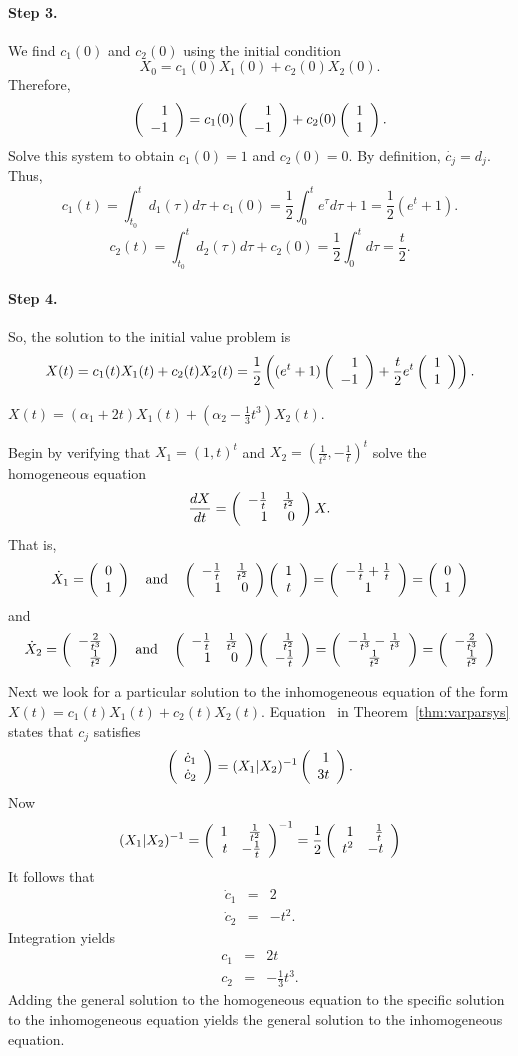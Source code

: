 \paragraph{Step 3.} We find $c_1(0)$ and $c_2(0)$ using the initial
condition
\[
X_0 = c_1(0)X_1(0) + c_2(0)X_2(0).
\]
Therefore,
\[
\left(\begin{array}{r} 1 \\ -1\end{array}\right) = c_1(0)\left(\begin{array}{r} 1 \\ -1\end{array}\right) + c_2(0)\left(\begin{array}{r} 1 \\ 1\end{array}\right).
\]
Solve this system to obtain $c_1(0) = 1$ and $c_2(0) = 0$.  By definition,
$\dot{c_j} = d_j$.  Thus,
\[
c_1(t) = \int_{t_0}^td_1(\tau)d\tau + c_1(0)
= \frac{1}{2}\int_0^te^\tau d\tau + 1 = \frac{1}{2}(e^t + 1).
\]
\[
c_2(t) = \int_{t_0}^td_2(\tau)d\tau + c_2(0)
= \frac{1}{2}\int_0^td\tau = \frac{t}{2}.
\]
\paragraph{Step 4.} So, the solution to the initial value problem is
\[
X(t) = c_1(t)X_1(t) + c_2(t)X_2(t)
= \frac{1}{2}\left((e^t + 1)\left(\begin{array}{r} 1 \\ -1\end{array}\right) + \frac{t}{2}e^t\left(\begin{array}{r} 1 \\ 1\end{array}\right)
\right).
\]

 \ans $X(t) = (\alpha_1+2t)X_1(t) + 
\left(\alpha_2-\frac{1}{3}t^3 \right)X_2(t)$.

\soln  Begin by verifying that $X_1=(1,t)^t$ and 
$X_2=(\frac{1}{t^2},-\frac{1}{t})^t$ solve the homogeneous
equation
\[
\frac{dX}{dt}= \left(\begin{array}{rr} -\frac{1}{t} & \frac{1}{t^2}\\ 1 &0\end{array}\right)X.
\]
That is,
\[
\dot{X}_1 = \left(\begin{array}{c} 0 \\ 1\end{array}\right) \quad\mbox{and}\quad 
\left(\begin{array}{rr} -\frac{1}{t} & \frac{1}{t^2}\\ 1 &0\end{array}\right)\left(\begin{array}{c} 1 \\ t\end{array}\right) = 
\left(\begin{array}{c} -\frac{1}{t}+\frac{1}{t} \\ 1\end{array}\right) = \left(\begin{array}{c} 0 \\ 1\end{array}\right)
\]
and 
\[
\dot{X}_2 = \left(\begin{array}{r} -\frac{2}{t^3} \\ \frac{1}{t^2}\end{array}\right) \quad\mbox{and}\quad 
\left(\begin{array}{rr} -\frac{1}{t} & \frac{1}{t^2}\\ 1 &0\end{array}\right)
\left(\begin{array}{r} \frac{1}{t^2} \\ -\frac{1}{t}\end{array}\right) = 
\left(\begin{array}{c} -\frac{1}{t^3}-\frac{1}{t^3} \\ \frac{1}{t^2}\end{array}\right) 
= \left(\begin{array}{r} -\frac{2}{t^3} \\ \frac{1}{t^2}\end{array}\right)
\]

Next we look for a particular solution to the inhomogeneous equation of 
the form $X(t)=c_1(t)X_1(t)+c_2(t)X_2(t)$.  Equation~ in
Theorem~\ref{thm:varparsys} states that $c_j$ satisfies
\[
\left(\begin{array}{r} \dot{c}_1 \\ \dot{c}_2\end{array}\right) = (X_1|X_2)^{-1} \left(\begin{array}{r} 1 \\ 3t\end{array}\right).
\]
Now 
\[
(X_1|X_2)^{-1} = \left(\begin{array}{rr} 1 & \frac{1}{t^2}\\ t &-\frac{1}{t}\end{array}\right)^{-1} = 
\frac{1}{2}\left(\begin{array}{rr} 1 & \frac{1}{t}\\ t^2 &-t\end{array}\right)
\]
It follows that 
\begin{eqnarray*}
\dot{c}_1 & = & 2 \\
\dot{c}_2 & = & -t^2.
\end{eqnarray*}
Integration yields
\begin{eqnarray*} 
c_1 & = & 2t\\
c_2 & = & -\frac{1}{3}t^3.
\end{eqnarray*}
Adding the general solution to the homogeneous equation to the specific
solution to the inhomogeneous equation yields the general solution to the
inhomogeneous equation.



